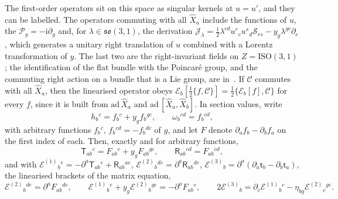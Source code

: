 The first-order operators sit on this space as singular kernels at \(u=u'\), and they can be labelled. The operators commuting with all \(\hat X_a\) include the functions of \(u\), the \(\mathcal P_g=-\mathrm i\partial_g\) and, for \(\lambda\in\mathfrak{so}(3,1)\), the derivation \(\mathcal J_\lambda=\tfrac12\lambda^{cd}u^{r}{}_cu^{s}{}_d\mathcal S_{rs}-y_g\lambda^{gc}\partial_c\), which generates a unitary right translation of \(u\) combined with a Lorentz transformation of \(y\). The last two are the right-invariant fields on \(Z=\mathrm{ISO}(3,1)\); the identification of the flat bundle with the Poincar\'e group, and the commuting right action on a bundle that is a Lie group, are in~\cite{Hanada2006}. If \(\mathcal C\) commutes with all \(\hat X_a\), then the linearised operator obeys \(\mathcal E_b[\tfrac12\{f,\mathcal C\}]=\tfrac12\{\mathcal E_b[f],\mathcal C\}\) for every \(f\), since it is built from \(\mathrm{ad}\,\hat X_a\) and \(\mathrm{ad}\,[\hat X_a,\hat X_b]\). In section values, write
\[
h_b{}^c=f_b{}^c+y_gf_b{}^{gc},\qquad\omega_b{}^{cd}=f_b{}^{cd},
\]
with arbitrary functions \(f_b{}^c\), \(f_b{}^{cd}=-f_b{}^{dc}\) of \(y\), and let \(F\) denote \(\partial_af_b-\partial_bf_a\) on the first index of each. Then, exactly and for arbitrary functions,
\[
\mathsf T_{ab}{}^c=F_{ab}{}^c+y_gF_{ab}{}^{gc},\qquad\mathsf R_{ab}{}^{cd}=F_{ab}{}^{cd},
\]
and with \(\mathcal E^{(1)}{}_b{}^e=-\partial^a\mathsf T_{ab}{}^e+\mathsf R_{ab}{}^{ae}\), \(\mathcal E^{(2)}{}_b{}^{de}=\partial^a\mathsf R_{ab}{}^{de}\), \(\mathcal E^{(3)}{}_b=\partial^a(\partial_a\mathsf t_b-\partial_b\mathsf t_a)\), the linearised brackets of the matrix equation,
\[
\mathcal E^{(2)}{}_b{}^{de}=\partial^aF_{ab}{}^{de},\qquad
\mathcal E^{(1)}{}_b{}^e+y_g\mathcal E^{(2)}{}_b{}^{ge}=-\partial^aF_{ab}{}^e,\qquad
2\mathcal E^{(3)}{}_b=\partial_c\mathcal E^{(1)}{}_b{}^c-\eta_{bg}\mathcal E^{(2)}{}_c{}^{gc}.
\]
